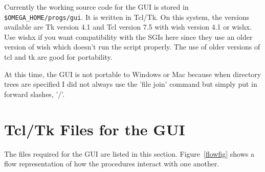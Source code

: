 \documentclass[12pt]{book}
\begin{document}
Currently the working source code for the GUI is stored in
\verb+$OMEGA_HOME/progs/gui+.
It is written in Tcl/Tk.  On this system, the
versions available are Tk version 4.1 and Tcl version 7.5 with wish
version 4.1 or wishx.  Use wishx if you want compatibility with the
SGIs here since they use an older version of wish which doesn't run the
script properly.  The use of older versions of tcl and tk are good for
portability.

At this time, the GUI is not portable to Windows or Mac because when
directory trees are specified I did not always use the 'file join' command but
simply put in forward slashes, '/'.

\section{Tcl/Tk Files for the GUI}

The files required for the GUI are listed in this section.
Figure~\ref{flowfig} shows a flow representation of how the procedures
interact with one another.
\end{document}
